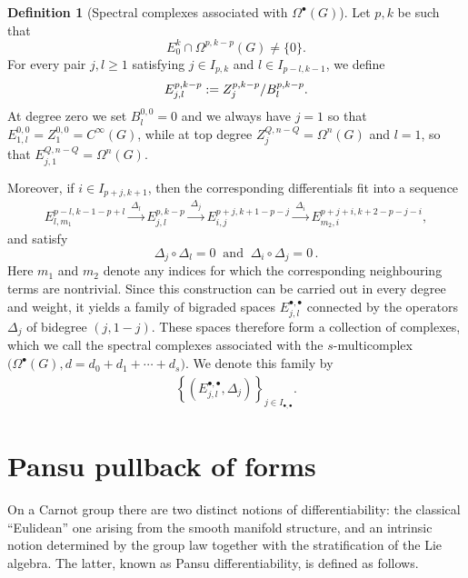 \documentclass[dvipsnames]{amsart}
\theoremstyle{definition}
\newtheorem{definition}[theorem]{Definition}
\theoremstyle{definition}
\numberwithin{equation}{section}
\begin{document}
\begin{definition}[Spectral complexes associated with $\Omega^\bullet(G)$] \label{def: spectral complexes}
Let $p,k$ be such that \[ E_0^k\cap\Omega^{p,k-p}(G)\neq\{0\}. \] For every pair $j,l\geq1$ satisfying $j\in I_{p,k}$ and $l\in I_{p-l,k-1}$, we define \begin{align}\label{eq: E_{j,l}} E_{j,l}^{p,k-p} := Z_j^{p,k-p}/B_l^{p,k-p}.
\end{align} 
At degree zero we set $B_l^{0,0}=0$ and we always have $j=1$ so that $E_{1,l}^{0,0}=Z_1^{0,0}=C^\infty(G)$, while at top degree $Z_j^{Q,n-Q}=\Omega^{n}(G)$ and $l=1$, so that $E_{j,1}^{Q,n-Q}=\Omega^n(G)$.


Moreover, if $i\in I_{p+j,k+1}$, then the corresponding differentials fit into a sequence 
\begin{align*} E_{l,m_1}^{p-l,k-1-p+l} \xrightarrow{\ \Delta_l\ } E_{j,l}^{p,k-p} \xrightarrow{\ \Delta_j\ } E_{i,j}^{p+j,k+1-p-j} \xrightarrow{\ \Delta_i\ } E_{m_2,i}^{p+j+i,k+2-p-j-i},
\end{align*} and satisfy
\[ \Delta_j\circ\Delta_l=0\ \text{ and } \ \Delta_i\circ\Delta_j=0\,. \] 
Here $m_1$ and $m_2$ denote any indices for which the corresponding neighbouring terms are nontrivial. Since this construction can be carried out in every degree and weight, it yields a family of bigraded spaces $E_{j,l}^{\bullet,\bullet}$ connected by the operators $\Delta_j$ of bidegree $(j,1-j)$. These spaces therefore form a collection of complexes, which we call the spectral complexes associated with the $s$-multicomplex $\bigl(\Omega^\bullet(G),d=d_0+d_1+\cdots+d_s\bigr)$. We denote this family by 
\begin{align*} \left\{ \left(E_{j,l}^{\bullet,\bullet},\Delta_j\right) \right\}_{j\in I_{\bullet,\bullet}}.
\end{align*} 
\end{definition}



\section{Pansu pullback of forms}\label{chapter pansu pullback}

On a Carnot group there are two distinct notions of differentiability: the classical ``Eulidean'' one arising from the smooth manifold structure, and an intrinsic notion determined by the group law together with the stratification of the Lie algebra. The latter, known as Pansu differentiability, is defined as follows.
\end{document}
